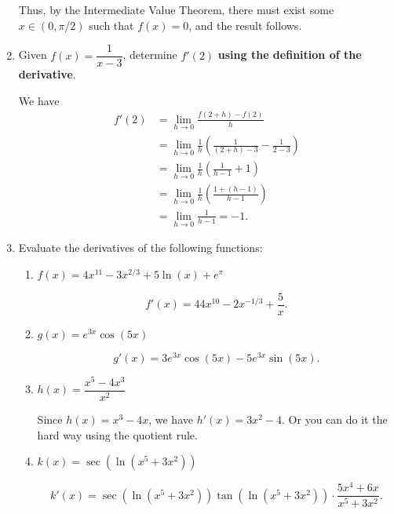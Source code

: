 \documentclass[12pt]{article}
\begin{document}
\begin{enumerate}
Thus, by the Intermediate Value Theorem, there must exist some $x\in (0,\pi/2)$ such that $f(x)=0$, and the result follows. 
\newpage

\item Given $f(x) = \dfrac{1}{x-3}$, determine $f'(2)$ \textbf{using the definition of the derivative}. 

\bigskip

We have
\begin{align*}
f'(2) & = \lim_{h\to 0}\frac{f(2+h)-f(2)}{h}\\
& = \lim_{h\to 0}\frac{1}{h}\left(\frac{1}{(2+h)-3}-\frac{1}{2-3}\right)\\
& = \lim_{h\to 0}\frac{1}{h}\left(\frac{1}{h-1}+1\right)\\
& = \lim_{h\to 0}\frac{1}{h}\left(\frac{1+(h-1)}{h-1}\right)\\
& = \lim_{h\to 0}\frac{1}{h-1} = -1.
\end{align*}

\bigskip

\item Evaluate the derivatives of the following functions:
\begin{enumerate}
\item $f(x) = 4x^{11}-3x^{2/3}+5\ln(x)+e^\pi$

\[
f'(x) = 44x^{10}-2x^{-1/3}+\frac{5}{x}.
\]

\item $g(x) = e^{3x}\cos(5x)$

\[
g'(x) = 3e^{3x}\cos(5x)-5e^{3x}\sin(5x).
\]

\item $h(x) = \dfrac{x^5-4x^3}{x^2}$

\medskip

Since $h(x) = x^3-4x$, we have $h'(x) = 3x^2-4$. Or you can do it the hard way using the quotient rule.

\medskip


\item $k(x) = \sec(\ln(x^5+3x^2))$

\[
k'(x) = \sec(\ln(x^5+3x^2))\tan(\ln(x^5+3x^2))\cdot \frac{5x^4+6x}{x^5+3x^2}.
\]

\end{enumerate}
\end{enumerate}
\end{document}

